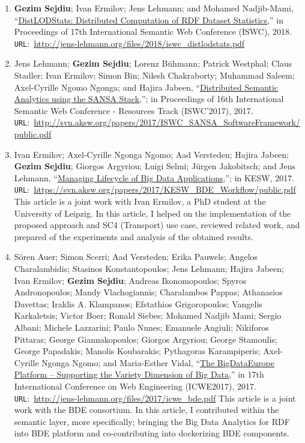 \begin{itemize}
\begin{enumerate}
    \item \textbf{Gezim Sejdiu}; Ivan Ermilov; Jens Lehmann; and Mohamed Nadjib-Mami, “\href{http://jens-lehmann.org/files/2018/iswc_distlodstats.pdf}{DistLODStats: Distributed Computation of RDF Dataset Statistics},” in Proceedings of 17th International Semantic Web Conference (ISWC), 2018. \texttt{URL}:~\url{http://jens-lehmann.org/files/2018/iswc_distlodstats.pdf}

    \item Jens Lehmann; \textbf{Gezim Sejdiu}; Lorenz Bühmann; Patrick Westphal; Claus Stadler; Ivan Ermilov; Simon Bin; Nilesh Chakraborty; Muhammad Saleem; Axel-Cyrille Ngomo Ngonga; and Hajira Jabeen, “\href{http://svn.aksw.org/papers/2017/ISWC_SANSA_SoftwareFramework/public.pdf}{Distributed Semantic Analytics using the SANSA Stack},”; in Proceedings of 16th International Semantic Web Conference - Resources Track (ISWC’2017), 2017. \texttt{URL}:~\url{http://svn.aksw.org/papers/2017/ISWC_SANSA_SoftwareFramework/public.pdf}
    
    \item Ivan Ermilov; Axel-Cyrille Ngonga Ngomo; Aad Versteden; Hajira Jabeen; \textbf{Gezim Sejdiu}; Giorgos Argyriou; Luigi Selmi; Jürgen Jakobitsch; and Jens Lehmann, “\href{https://svn.aksw.org/papers/2017/KESW_BDE_Workflow/public.pdf}{Managing Lifecycle of Big Data Applications},”; in KESW, 2017. \texttt{URL}:~\url{https://svn.aksw.org/papers/2017/KESW_BDE_Workflow/public.pdf}
    This article is a joint work with Ivan Ermilov, a PhD student at the University of Leipzig. 
    In this article, I helped on the implementation of the proposed approach and SC4 (Transport) use case, reviewed related work, and prepared of the experiments and analysis of the obtained results.

    \item Sören Auer; Simon Scerri; Aad Versteden; Erika Pauwels; Angelos Charalambidis; Stasinos Konstantopoulos; Jens Lehmann; Hajira Jabeen; Ivan Ermilov; \textbf{Gezim Sejdiu}; Andreas Ikonomopoulos; Spyros Andronopoulos; Mandy Vlachogiannis; Charalambos Pappas; Athanasios Davettas; Iraklis A. Klampanos; Efstathios Grigoropoulos; Vangelis Karkaletsis; Victor Boer; Ronald Siebes; Mohamed Nadjib Mami; Sergio Albani; Michele Lazzarini; Paulo Nunes; Emanuele Angiuli; Nikiforos Pittaras; George Giannakopoulos; Giorgos Argyriou; George Stamoulis; George Papadakis; Manolis Koubarakis; Pythagoras Karampiperis; Axel-Cyrille Ngonga Ngomo; and Maria-Esther Vidal, “\href{http://jens-lehmann.org/files/2017/icwe_bde.pdf}{The BigDataEurope Platform – Supporting the Variety Dimension of Big Data},” in 17th International Conference on Web Engineering (ICWE2017), 2017. \texttt{URL}:~\url{http://jens-lehmann.org/files/2017/icwe_bde.pdf}
    This article is a joint work with the BDE consortium. 
    In this article, I contributed within the semantic layer, more specifically; bringing the Big Data Analytics for RDF into BDE platform and co-contributing into dockerizing BDE components.
     

\end{enumerate}
\end{itemize}
